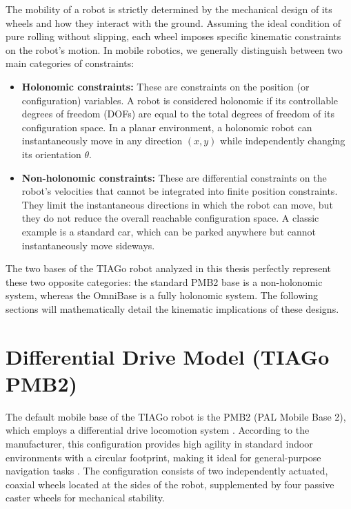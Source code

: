 The mobility of a robot is strictly determined by the mechanical design of its wheels and how they interact with the ground. Assuming the ideal condition of pure rolling without slipping, each wheel imposes specific kinematic constraints on the robot's motion. In mobile robotics, we generally distinguish between two main categories of constraints:

\begin{itemize}
    \item \textbf{Holonomic constraints:} These are constraints on the position (or configuration) variables. A robot is considered holonomic if its controllable degrees of freedom (DOFs) are equal to the total degrees of freedom of its configuration space. In a planar environment, a holonomic robot can instantaneously move in any direction $(x, y)$ while independently changing its orientation $\theta$.
    
    \item \textbf{Non-holonomic constraints:} These are differential constraints on the robot's velocities that cannot be integrated into finite position constraints. They limit the instantaneous directions in which the robot can move, but they do not reduce the overall reachable configuration space. A classic example is a standard car, which can be parked anywhere but cannot instantaneously move sideways.
\end{itemize}

The two bases of the TIAGo robot analyzed in this thesis perfectly represent these two opposite categories: the standard PMB2 base is a non-holonomic system, whereas the OmniBase is a fully holonomic system. The following sections will mathematically detail the kinematic implications of these designs.


\section{Differential Drive Model (TIAGo PMB2)}
\label{sec:diff_model}

The default mobile base of the TIAGo robot is the PMB2 (PAL Mobile Base 2), which employs a differential drive locomotion system \cite{pal_tiago_base}. According to the manufacturer, this configuration provides high agility in standard indoor environments with a circular footprint, making it ideal for general-purpose navigation tasks \cite{pal_blog_omni_diff}. The configuration consists of two independently actuated, coaxial wheels located at the sides of the robot, supplemented by four passive caster wheels for mechanical stability.

